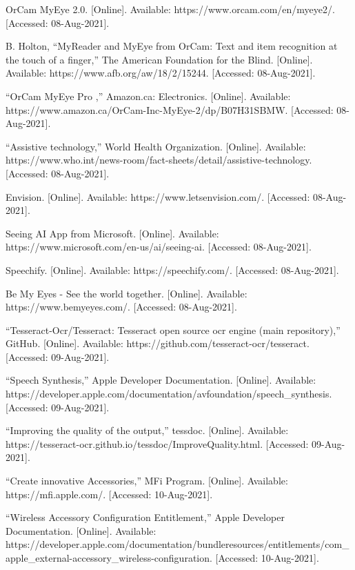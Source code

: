 \documentclass[a4paper,11pt]{article}
\begin{document}
\begin{thebibliography}{9}
OrCam MyEye 2.0. [Online]. Available: https://www.orcam.com/en/myeye2/. [Accessed: 08-Aug-2021].

B. Holton, “MyReader and MyEye from OrCam: Text and item recognition at the touch of a finger,” The American Foundation for the Blind. [Online]. Available: https://www.afb.org/aw/18/2/15244. [Accessed: 08-Aug-2021]. 

“OrCam MyEye Pro ,” Amazon.ca: Electronics. [Online]. Available: https://www.amazon.ca/OrCam-Inc-MyEye-2/dp/B07H31SBMW. [Accessed: 08-Aug-2021].

“Assistive technology,” World Health Organization. [Online]. Available: https://www.who.int/news-room/fact-sheets/detail/assistive-technology. [Accessed: 08-Aug-2021]. 

Envision. [Online]. Available: https://www.letsenvision.com/. [Accessed: 08-Aug-2021].

Seeing AI App from Microsoft. [Online]. Available: https://www.microsoft.com/en-us/ai/seeing-ai. [Accessed: 08-Aug-2021]. 

Speechify. [Online]. Available: https://speechify.com/. [Accessed: 08-Aug-2021]. 

Be My Eyes - See the world together. [Online]. Available: https://www.bemyeyes.com/. [Accessed: 08-Aug-2021]. 

“Tesseract-Ocr/Tesseract: Tesseract open source ocr engine (main repository),” GitHub. [Online]. Available: https://github.com/tesseract-ocr/tesseract. [Accessed: 09-Aug-2021]. 

“Speech Synthesis,” Apple Developer Documentation. [Online]. Available: https://developer.apple.com/documentation/avfoundation/speech\_synthesis. [Accessed: 09-Aug-2021]. 

“Improving the quality of the output,” tessdoc. [Online]. Available: https://tesseract-ocr.github.io/tessdoc/ImproveQuality.html. [Accessed: 09-Aug-2021]. 

“Create innovative Accessories,” MFi Program. [Online]. Available: https://mfi.apple.com/. [Accessed: 10-Aug-2021]. 

“Wireless Accessory Configuration Entitlement,” Apple Developer Documentation. [Online]. Available: https://developer.apple.com/documentation/bundleresources/entitlements/com\_apple\_external-accessory\_wireless-configuration. [Accessed: 10-Aug-2021]. 


\end{thebibliography}
\end{document}
